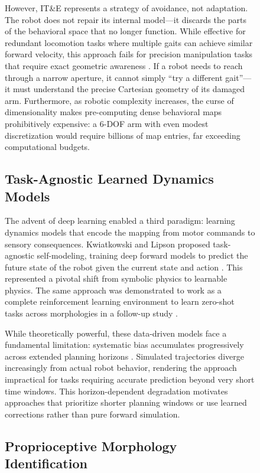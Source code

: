 \documentclass[12pt,a4paper,oneside]{report}
\begin{document}
\begin{figure}[H]
However, IT\&E represents a strategy of avoidance, not adaptation. The robot does not repair its internal model---it discards the parts of the behavioral space that no longer function. While effective for redundant locomotion tasks where multiple gaits can achieve similar forward velocity, this approach fails for precision manipulation tasks that require exact geometric awareness \cite{kwiatkowski2019task}. If a robot needs to reach through a narrow aperture, it cannot simply ``try a different gait''---it must understand the precise Cartesian geometry of its damaged arm. Furthermore, as robotic complexity increases, the curse of dimensionality makes pre-computing dense behavioral maps prohibitively expensive: a 6-DOF arm with even modest discretization would require billions of map entries, far exceeding computational budgets.

\subsection{Task-Agnostic Learned Dynamics Models}
\label{subsec:task_agnostic_models}

The advent of deep learning enabled a third paradigm: learning dynamics models that encode the mapping from motor commands to sensory consequences. Kwiatkowski and Lipson proposed task-agnostic self-modeling, training deep forward models to predict the future state of the robot given the current state and action \cite{kwiatkowski2019task}. This represented a pivotal shift from symbolic physics to learnable physics. The same approach was demonstrated to work as a complete reinforcement learning environment to learn zero-shot tasks across morphologies in a follow-up study \cite{kwiatkowski2019zeroshot}.

While theoretically powerful, these data-driven models face a fundamental limitation: systematic bias accumulates progressively across extended planning horizons \cite{kwiatkowski2019task}. Simulated trajectories diverge increasingly from actual robot behavior, rendering the approach impractical for tasks requiring accurate prediction beyond very short time windows. This horizon-dependent degradation motivates approaches that prioritize shorter planning windows or use learned corrections rather than pure forward simulation.

\subsection{Proprioceptive Morphology Identification}
\label{subsec:proprioceptive_identification}


\end{figure}
\end{document}
